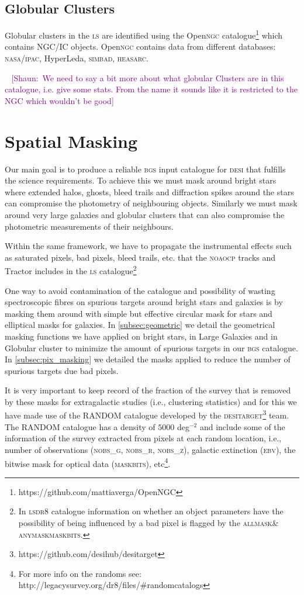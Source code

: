 \documentclass[fleqn,usenatbib]{mnras}
\newcommand{\shaun}[1]{~\newline\noindent \textcolor{Purple}{{ [Shaun:~{#1}]\\}}}
\newcommand{\ALLMASK}{\textsc{allmask}\xspace}
\newcommand{\ANYMASK}{\textsc{anymask}\xspace}
\newcommand{\BGS}{\textsc{bgs}\xspace}
\newcommand{\CP}{\textsc{cp}\xspace}
\newcommand{\DESI}{\textsc{desi}\xspace}
\newcommand{\DESITARGET}{\textsc{desitarget}\xspace}
\newcommand{\DReight}{\textsc{dr8}\xspace}
\newcommand{\EBV}{\textsc{ebv}\xspace}
\newcommand{\IPAC}{\textsc{ipac}\xspace}
\newcommand{\LS}{\textsc{ls}\xspace}
\newcommand{\MASKBITS}{\textsc{maskbits}\xspace}
\newcommand{\NOAO}{\textsc{noao}\xspace}
\newcommand{\NASA}{\textsc{nasa}\xspace}
\newcommand{\NGC}{\textsc{ngc}\xspace}
\newcommand{\NOBSG}{\textsc{nobs\_g}\xspace}
\newcommand{\NOBSR}{\textsc{nobs\_r}\xspace}
\newcommand{\NOBSZ}{\textsc{nobs\_z}\xspace}
\newcommand{\TRACTOR}{\textsc{T}ractor\xspace}
\begin{document}
\subsection{Globular Clusters}

Globular clusters in the \LS are identified using the Open\NGC catalogue\footnote{https://github.com/mattiaverga/OpenNGC} which contains NGC/IC objects. Open\NGC contains data from different databases: \NASA/\IPAC, HyperLeda, \textsc{simbad}, \textsc{heasarc}.

\shaun{We need to say a bit more about what globular Clusters are in this catalogue, i.e. give some stats. From the name it sounds like it is restricted to the NGC which wouldn't be good}

\section{Spatial Masking}\label{sec:spatial_masking}

Our main goal is to produce a reliable \BGS input catalogue for \DESI that fulfills the science requirements. To achieve this we must mask around bright stars where extended halos, ghosts, bleed trails and diffraction spikes around the stars can compromise the photometry of neighbouring objects. Similarly we must mask around very large galaxies  and globular clusters  that can also compromise the photometric measurements of their neighbours. 

Within the same framework, we have to propagate the instrumental effects such as saturated pixels, bad pixels, bleed trails, etc. that the \NOAO \CP tracks and \TRACTOR includes in the \LS catalogue\footnote{In \LS \DReight catalogue information on whether an object parameters have the possibility of being influenced by a bad pixel is flagged by the \ALLMASK \& \ANYMASK \MASKBITS.} 

One way to avoid contamination of the catalogue and possibility of wasting spectroscopic fibres on spurious targets around bright stars and galaxies
is by masking them around with simple but effective circular mask for stars and elliptical masks for galaxies. In \ref{subsec:geometric} we detail the geometrical masking functions we have applied on bright stars, in Large Galaxies and in Globular cluster to minimize the amount of spurious targets in our \BGS catalogue.  In \ref{subsec:pix_masking} we detailed the masks applied to reduce the number of spurious targets due bad pixels. 

It is very important to keep record of the fraction of the survey that is removed by these masks for extragalactic studies (i.e., clustering statistics) and for this we have made use of the RANDOM catalogue developed by the \DESITARGET\footnote{https://github.com/desihub/desitarget} team. The RANDOM catalogue has a density of $5000$ deg$^{-2}$ and include some of the information of the survey extracted from pixels at each random location, i.e., number of observations (\NOBSG, \NOBSR, \NOBSZ), galactic extinction (\EBV), the bitwise mask for optical data (\MASKBITS), etc\footnote{For more info on the randoms see: http://legacysurvey.org/dr8/files/\#random\-catalogs}.
\end{document}
